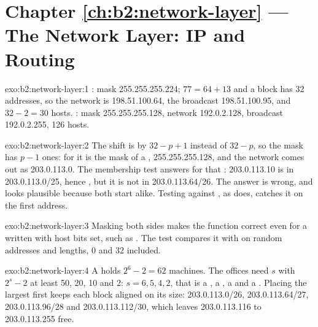 \section*{Chapter \ref{ch:b2:network-layer} --- The Network Layer: IP and Routing}

\begin{solution}{exo:b2:network-layer:1}
: mask 255.255.255.224; $77 = 64 + 13$ and a  block has 32 addresses, so the network
is 198.51.100.64, the broadcast 198.51.100.95, and $32 - 2 = 30$ hosts. : mask 255.255.255.128,
network 192.0.2.128, broadcast 192.0.2.255, 126 hosts.
\end{solution}

\begin{solution}{exo:b2:network-layer:2}
The shift is by $32 - p + 1$ instead of $32 - p$, so the mask has $p - 1$ ones: for  it is the mask of a
, 255.255.255.128, and the network comes out as 203.0.113.0. The membership test answers for that
: 203.0.113.10 is in 203.0.113.0/25, hence , but it is not in 203.0.113.64/26. The answer is
wrong, and looks plausible because both  start alike. Testing against , as 
does, catches it on the first address.
\end{solution}

\begin{solution}{exo:b2:network-layer:3}
Masking both sides makes the function correct even for a  written with host bits set, such as
. The test compares it with  on random addresses and lengths, 0 and 32
included.
\end{solution}

\begin{solution}{exo:b2:network-layer:4}
A  holds $2^6 - 2 = 62$ machines. The offices need $s$ with $2^s - 2$ at least 50, 20, 10 and 2: $s = 6, 5,
4, 2$, that is a , a , a  and a . Placing the largest first keeps each block
aligned on its size: 203.0.113.0/26, 203.0.113.64/27, 203.0.113.96/28 and 203.0.113.112/30, which leaves
203.0.113.116 to 203.0.113.255 free.
\end{solution}

